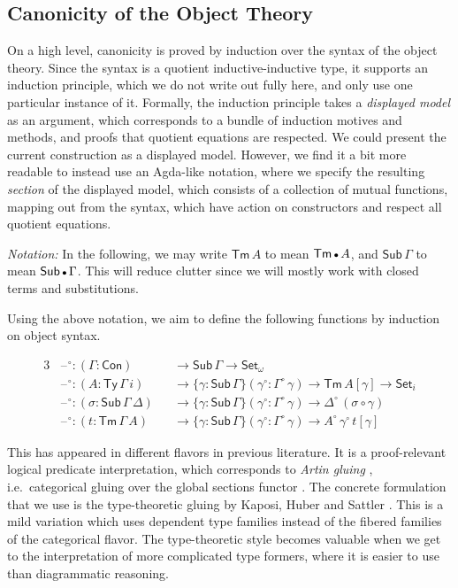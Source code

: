\documentclass[acmsmall,screen,review,anonymous]{acmart}
\newcommand{\msf}[1]{{\mathsf{#1}}}
\newcommand{\Set}{\msf{Set}}
\newcommand{\blank}{{\mathord{\hspace{1pt}\text{--}\hspace{1pt}}}}
\newcommand{\emptycon}{\scaleobj{.75}\bullet}
\newcommand{\Con}{\msf{Con}}
\newcommand{\Sub}{\msf{Sub}}
\newcommand{\Ty}{\msf{Ty}}
\newcommand{\Tm}{\msf{Tm}}
\newcommand{\w}{\circ}
\begin{document}
\subsection{Canonicity of the Object Theory}\label{sec:canonicity-model}

On a high level, canonicity is proved by induction over the syntax of the object
theory. Since the syntax is a quotient inductive-inductive type, it supports an induction principle,
which we do not write out fully here, and only use one particular instance of it. Formally, the
induction principle takes a \emph{displayed model} as an argument, which corresponds to a bundle of
induction motives and methods, and proofs that quotient equations are respected. We could present
the current construction as a displayed model. However, we find it a bit more readable to instead
use an Agda-like notation, where we specify the resulting \emph{section} of the displayed model,
which consists of a collection of mutual functions, mapping out from the syntax, which have action
on constructors and respect all quotient equations.

\emph{Notation:} In the following, we may write $\Tm\,A$ to mean $\Tm\,\emptycon\,A$, and
$\Sub\,\Gamma$ to mean $\Sub\,\emptycon\,\Gamma$. This will reduce clutter since we will mostly work
with closed terms and substitutions.

Using the above notation, we aim to define the following functions by induction on object syntax.

\begin{alignat*}{3}
  &\blank^\w : (\Gamma : \Con)      && \to \Sub\,\Gamma \to \Set_\omega\\
  &\blank^\w : (A : \Ty\,\Gamma\,i) && \to \{\gamma : \Sub\,\Gamma\}(\gamma^\w : \Gamma^\w\,\gamma) \to \Tm\,A[\gamma] \to \Set_i\\
  &\blank^\w : (\sigma : \Sub\,\Gamma\,\Delta) && \to \{\gamma : \Sub\,\Gamma\}(\gamma^\w : \Gamma^\w\,\gamma) \to \Delta^\w\,(\sigma \circ \gamma)\\
  &\blank^\w : (t : \Tm\,\Gamma\,A) && \to \{\gamma : \Sub\,\Gamma\}(\gamma^\w : \Gamma^\w\,\gamma) \to A^\w\,\gamma^\w\,t[\gamma]
\end{alignat*}

This has appeared in different flavors in previous literature. It is a proof-relevant logical
predicate interpretation, which corresponds to \emph{Artin gluing} \cite{TODO}, i.e.\ categorical
gluing over the global sections functor \cite{TODO}. The concrete formulation that we use is the
type-theoretic gluing by Kaposi, Huber and Sattler \cite{TODO}. This is a mild variation which uses
dependent type families instead of the fibered families of the categorical flavor. The
type-theoretic style becomes valuable when we get to the interpretation of more complicated type
formers, where it is easier to use than diagrammatic reasoning.
\end{document}
